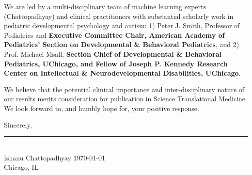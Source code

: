 \documentclass[9pt,onecolumn,compsoc]{IEEEtran}
\newcommand{\Space}{\vspace{10pt}}
\def\JNAME{Science Translational Medicine\xspace}
\begin{document}
We are led by a multi-disciplinary team  of machine learning experts (Chattopadhyay) and clinical practitioners with substantial scholarly  work in pediatric developmental psychology and autism: 1) Peter J. Smith, Professor of Pediatrics and \textbf{Executive Committee Chair, American Academy of Pediatrics' Section on Developmental \& Behavioral
Pediatrics}, and 2) Prof. Michael Msall, \textbf{Section Chief of Developmental \& Behavioral Pediatrics, UChicago, and Fellow of Joseph  P. Kennedy Research Center on Intellectual \& Neurodevelopmental Disabilities, UChicago}.
 
We believe that  the potential clinical importance  and  inter-disciplinary nature of our results  merits consideration  for  publication in \JNAME.  We look forward to, and humbly hope for, your positive  response.
\Space

Sincerely,
\vspace{-20pt}

% 
\begin{flushleft}
\vspace{-30pt}

\rule{2.5in}{1pt}\\
{\fontsize{10}{10}\selectfont Ishanu Chattopadhyay}
\hfill \today\\
Chicago, IL
\end{flushleft}

\end{document}
